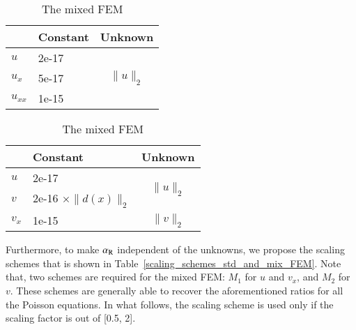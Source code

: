 \documentclass[review,3p]{elsarticle}
\begin{document}
\begin{table}[!ht]
\small
{}
\hspace{3.5cm}
\begin{subtable}{0.4\textwidth}
\caption{The standard FEM}
\begin{tabular}{l l c}
\hline
 & Constant & Unknown \\ \hline
$u$ & 2e-17 & \multirow{3}{*}{$\|u\|_2$} \\ \cline{1-2}
$u_x$ & 5e-17 & \\ \cline{1-2}
$u_{xx}$ & 1e-15 & \\ \hline
\end{tabular}
\end{subtable}
\hspace{-2cm}
\begin{subtable}{.4\textwidth}
\caption{The mixed FEM}
\begin{tabular}{l l c}
\hline
 & Constant & Unknown \\ \hline
$u$ & 2e-17 & \multirow{2}{*}{$\|u\|_2$} \\ \cline{1-2} 
$v$ & 2e-16 $\times \|d(x)\|_2$ &  \\ \hline
$v_x$ & 1e-15 & $\|v\|_2$ \\ \hline
\end{tabular}
\end{subtable}
\label{relation_alpha_R_l2_norm}
\end{table}

Furthermore, to make $\alpha_{\rm R}$ independent of the unknowns, we propose the scaling schemes that is shown in Table~\ref{scaling_schemes_std_and_mix_FEM}. Note that, two schemes are required for the mixed FEM: $M_1$ for $u$ and $v_x$, and $M_2$ for $v$. These schemes are generally able to recover the aforementioned ratios for all the Poisson equations. In what follows, the scaling scheme is used only if the scaling factor is out of [0.5, 2]. 
\end{document}
